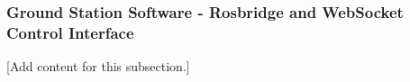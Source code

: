 
\subsubsection{Ground Station Software - Rosbridge and WebSocket Control Interface}
\label{subsubsec:design_7_7_ground_station_software}

[Add content for this subsection.]
